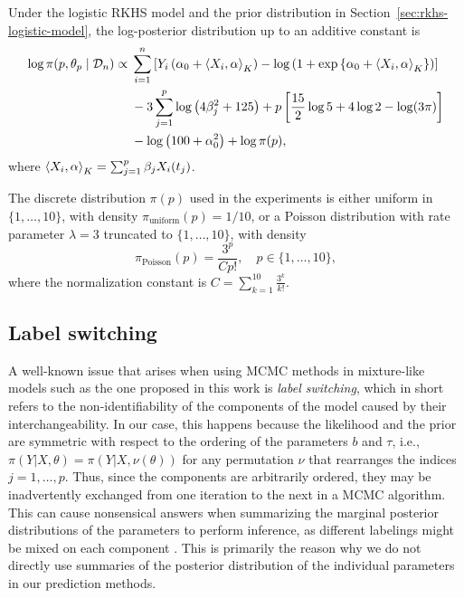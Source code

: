 \begin{proposition}
  Under the logistic RKHS model and the prior distribution in Section~\ref{sec:rkhs-logistic-model}, the log-posterior distribution up to an additive constant is 
  \begin{align*}
    \log \pi(p, \theta_p \mid \mathcal D_n) \propto {} & \sum_{i=1}^n \left[Y_i \left(\alpha_0 + \left\langle X_i,\alpha\right\rangle_K\right) - \log\left(1 + \exp\left\{\alpha_0 +\left\langle X_i,\alpha\right\rangle_K\right\}\right) \right]\\
     & - 3\sum_{j=1}^p \log\left(4\beta_j^2 + 125\right) + p \left[\frac{15}{2}\log 5 + 4 \log 2 - \log (3\pi)\right]\\
     & - \log\left(100 + \alpha_0^2\right) + \log \pi(p),
  \end{align*}
  where \(\left\langle X_i,\alpha\right\rangle_K = \sum_{j=1}^p \beta_j X_i(t_j)\).
\end{proposition}

The discrete distribution \(\pi(p)\) used in the experiments is either uniform in \(\{1,\dots, 10\}\), with density \(\pi_{\text{uniform}}(p)=1/10\), or a Poisson distribution with rate parameter \(\lambda=3\) truncated to \(\{1,\dots, 10\}\), with density
\[
\pi_{\text{Poisson}}(p) = \frac{3^p}{Cp!}, \quad p\in\{1,\dots,10\},
\]
where the normalization constant is \(C = \sum_{k=1}^{10} \frac{3^k}{k!}\).

\subsection{Label switching}\label{app:label-switching}

A well-known issue that arises when using MCMC methods in mixture-like models such as the one proposed in this work is \textit{label switching}, which in short refers to the non-identifiability of the components of the model caused by their interchangeability. In our case, this happens because the likelihood and the prior are symmetric with respect to the ordering of the parameters \(b\) and \(\tau\), i.e., \(\pi(Y|X,\theta)=\pi(Y|X, \nu(\theta))\) for any permutation \(\nu\) that rearranges the indices \(j=1,\dots, p\). Thus, since the components are arbitrarily ordered, they may be inadvertently exchanged from one iteration to the next in a MCMC algorithm. This can cause nonsensical answers when summarizing the marginal posterior distributions of the parameters to perform inference, as different labelings might be mixed on each component \citep{stephens2000dealing}. This is primarily the reason why we do not directly use summaries of the posterior distribution of the individual parameters in our prediction methods.


